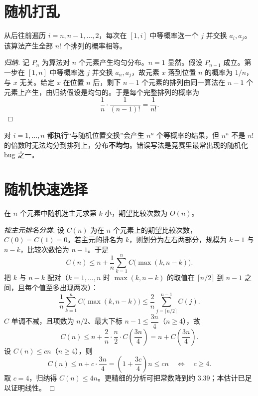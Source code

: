 \section{随机打乱}
\begin{theorem}
从后往前遍历 $i=n,n-1,\ldots,2$，每次在 $[1,i]$ 中等概率选一个 $j$ 并交换 $a_i,a_j$。该算法产生全部 $n!$ 个排列的概率相等。
\end{theorem}
\begin{proof}[归纳]
记 $P_n$ 为算法对 $n$ 个元素产生均匀分布。$n=1$ 显然。假设 $P_{n-1}$ 成立。第一步在 $[1,n]$ 中等概率选 $j$ 并交换 $a_n,a_j$，故元素 $x$ 落到位置 $n$ 的概率为 $1/n$，与 $x$ 无关。给定 $x$ 在位置 $n$ 后，剩下 $n-1$ 个元素的排列由同一算法在 $n-1$ 个元素上产生，由归纳假设是均匀的。于是每个完整排列的概率为
\[
\frac1n\cdot\frac1{(n-1)!}=\frac1{n!}.
\]
\end{proof}

\begin{pitfall}
对 $i=1,\ldots,n$ 都执行“与随机位置交换”会产生 $n^n$ 个等概率的结果，但 $n^n$ 不是 $n!$ 的倍数时无法均分到排列上，分布\textbf{不均匀}。错误写法是竞赛里最常出现的随机化 bug 之一。
\end{pitfall}

\section{随机快速选择}
\begin{theorem}[随机快速选择的期望复杂度]
在 $n$ 个元素中随机选主元求第 $k$ 小，期望比较次数为 $O(n)$。
\end{theorem}
\begin{proof}[按主元排名分类]
设 $C(n)$ 为在 $n$ 个元素上的期望比较次数，$C(0)=C(1)=0$。若主元的排名为 $k$，则划分为左右两部分，规模为 $k-1$ 与 $n-k$，比较次数恰为 $n-1$。于是
\[
C(n)\le n+\frac1n\sum_{k=1}^{n}C\bigl(\max(k,n-k)\bigr).
\]
把 $k$ 与 $n-k$ 配对（$k=1,\ldots,n$ 时 $\max(k,n-k)$ 的取值在 $\lceil n/2\rceil$ 到 $n-1$ 之间，且每个值至多出现两次）：
\[
\frac1n\sum_{k=1}^{n}C\bigl(\max(k,n-k)\bigr)
\le\frac{2}{n}\sum_{j=\lceil n/2\rceil}^{n-1}C(j).
\]
$C$ 单调不减，且项数为 $n/2$、最大下标 $n-1\le\dfrac{3n}{4}$（$n\ge4$），故
\[
C(n)\le n+\frac{2}{n}\cdot\frac n2\cdot C\!\left(\frac{3n}{4}\right)
=n+C\!\left(\frac{3n}{4}\right).
\]
设 $C(n)\le cn$（$n\ge4$），则
\[
C(n)\le n+c\cdot\frac{3n}{4}=\left(1+\frac{3c}{4}\right)n\le cn
\quad\Longleftrightarrow\quad c\ge4.
\]
取 $c=4$，归纳得 $C(n)\le4n$。更精细的分析可把常数降到约 $3.39$；本估计已足以证明线性。
\end{proof}

